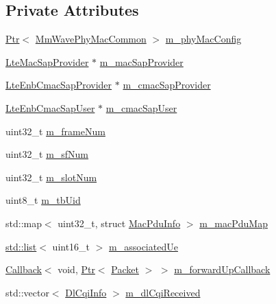 \subsection*{Private Attributes}
\begin{DoxyCompactItemize}
\item 
\hyperlink{classns3_1_1Ptr}{Ptr}$<$ \hyperlink{classns3_1_1MmWavePhyMacCommon}{Mm\+Wave\+Phy\+Mac\+Common} $>$ \hyperlink{classns3_1_1MmWaveEnbMac_a358d0c9a4ae2249b604143e654e7d45e}{m\+\_\+phy\+Mac\+Config}
\item 
\hyperlink{classns3_1_1LteMacSapProvider}{Lte\+Mac\+Sap\+Provider} $\ast$ \hyperlink{classns3_1_1MmWaveEnbMac_a4c1eaee1b7366110c97b4a76ffca0414}{m\+\_\+mac\+Sap\+Provider}
\item 
\hyperlink{classns3_1_1LteEnbCmacSapProvider}{Lte\+Enb\+Cmac\+Sap\+Provider} $\ast$ \hyperlink{classns3_1_1MmWaveEnbMac_aefc1014d555483603608020a09cf84f0}{m\+\_\+cmac\+Sap\+Provider}
\item 
\hyperlink{classns3_1_1LteEnbCmacSapUser}{Lte\+Enb\+Cmac\+Sap\+User} $\ast$ \hyperlink{classns3_1_1MmWaveEnbMac_ae4cb1289b73c49375271e651829be86c}{m\+\_\+cmac\+Sap\+User}
\item 
uint32\+\_\+t \hyperlink{classns3_1_1MmWaveEnbMac_a13df2d8bc521ce1f72b6b326b852c6d7}{m\+\_\+frame\+Num}
\item 
uint32\+\_\+t \hyperlink{classns3_1_1MmWaveEnbMac_a04ec543b367c36d292077fa91168894b}{m\+\_\+sf\+Num}
\item 
uint32\+\_\+t \hyperlink{classns3_1_1MmWaveEnbMac_a8c36f3e08fd6bb1908ff5b1b5c6917a9}{m\+\_\+slot\+Num}
\item 
uint8\+\_\+t \hyperlink{classns3_1_1MmWaveEnbMac_a9b0705d054ccb3087ea967c4b82030b6}{m\+\_\+tb\+Uid}
\item 
std\+::map$<$ uint32\+\_\+t, struct \hyperlink{structns3_1_1MacPduInfo}{Mac\+Pdu\+Info} $>$ \hyperlink{classns3_1_1MmWaveEnbMac_a72ab38c642f56564a655e65744e7df1a}{m\+\_\+mac\+Pdu\+Map}
\item 
\hyperlink{openflow-interface_8h_afd9bcfa176617760671b67580f536fa7}{std\+::list}$<$ uint16\+\_\+t $>$ \hyperlink{classns3_1_1MmWaveEnbMac_ad53ca15892331f4c02e6a312cce19ce6}{m\+\_\+associated\+Ue}
\item 
\hyperlink{classns3_1_1Callback}{Callback}$<$ void, \hyperlink{classns3_1_1Ptr}{Ptr}$<$ \hyperlink{classns3_1_1Packet}{Packet} $>$ $>$ \hyperlink{classns3_1_1MmWaveEnbMac_a02d759ccf858beb5ca156170450be4f7}{m\+\_\+forward\+Up\+Callback}
\item 
std\+::vector$<$ \hyperlink{structns3_1_1DlCqiInfo}{Dl\+Cqi\+Info} $>$ \hyperlink{classns3_1_1MmWaveEnbMac_a051d16bd2a2abb3389efb160f680116d}{m\+\_\+dl\+Cqi\+Received}

\end{DoxyCompactItemize}
